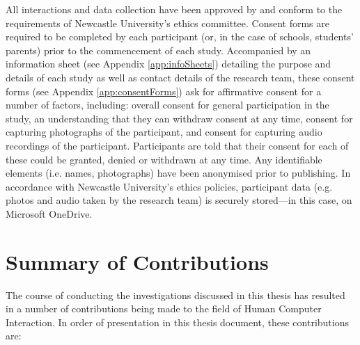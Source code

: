 All interactions and data collection have been approved by and conform to the requirements of Newcastle University’s ethics committee. Consent forms are required to be completed by each participant (or, in the case of schools, students' parents) prior to the commencement of each study. Accompanied by an information sheet (see Appendix \ref{app:infoSheets}) detailing the purpose and details of each study as well as contact details of the research team, these consent forms (see Appendix \ref{app:consentForms}) ask for affirmative consent for a number of factors, including: overall consent for general participation in the study, an understanding that they can withdraw consent at any time, consent for capturing photographs of the participant, and consent for capturing audio recordings of the participant. Participants are told that their consent for each of these could be granted, denied or withdrawn at any time. Any identifiable elements (i.e. names, photographs) have been anonymised prior to publishing. In accordance with Newcastle University's ethics policies, participant data (e.g. photos and audio taken by the research team) is securely stored---in this case, on Microsoft OneDrive.

\section{Summary of Contributions}
The course of conducting the investigations discussed in this thesis has resulted in a number of contributions being made to the field of Human Computer Interaction. In order of presentation in this thesis document, these contributions are:

